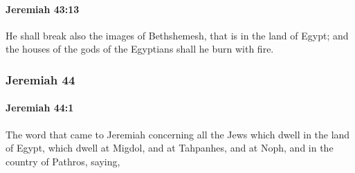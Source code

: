 		\paragraph{Jeremiah 43:13} %
			\label{JEREMIAH-43-13}

			He shall break also the images of Bethshemesh, that is in the land of Egypt; and the houses of the gods of the Egyptians shall he burn with fire.

	\subsubsection{Jeremiah 44} %
		\label{JEREMIAH-44}

		\paragraph{Jeremiah 44:1} %
			\label{JEREMIAH-44-1}

			The word that came to Jeremiah concerning all the Jews which dwell in the land of Egypt, which dwell at Migdol, and at Tahpanhes, and at Noph, and in the country of Pathros, saying,

